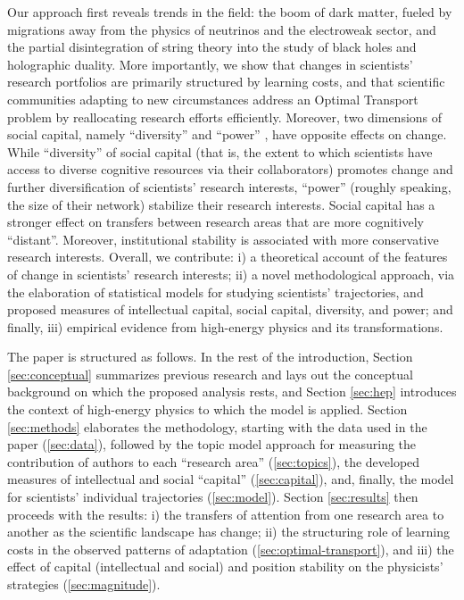 \documentclass{article}
\begin{document}
Our approach first reveals trends in the field: the boom of dark matter, fueled by migrations away from the physics of neutrinos and the electroweak sector, and the partial disintegration of string theory into the study of black holes and holographic duality. More importantly, we show that changes in scientists' research portfolios are primarily structured by learning costs, and that scientific communities adapting to new circumstances address an Optimal Transport problem by reallocating research efforts efficiently. Moreover, two dimensions of social capital, namely ``diversity'' and ``power'' \citep{Abbasi2014}, have opposite effects on change. While ``diversity'' of social capital (that is, the extent to which scientists have access to diverse cognitive resources via their collaborators) promotes change and further diversification of scientists' research interests, ``power'' (roughly speaking, the size of their network) stabilize their research interests. Social capital has a stronger effect on transfers between research areas that are more cognitively ``distant''. Moreover, institutional stability is associated with more conservative research interests. %
Overall, we contribute: i) a theoretical account of the features of change in scientists' research interests; ii) a novel methodological approach, via the elaboration of statistical models for studying scientists' trajectories, and proposed measures of intellectual capital, social capital, diversity, and power; and finally, iii) empirical evidence from high-energy physics and its transformations.

The paper is structured as follows. In the rest of the introduction, Section \ref{sec:conceptual} summarizes previous research and lays out the conceptual background on which the proposed analysis rests, and Section \ref{sec:hep} introduces the context of high-energy physics to which the model is applied. %
Section \ref{sec:methods} elaborates the methodology, starting with the data used in the paper (\ref{sec:data}), followed by the topic model approach for measuring the contribution of authors to each ``research area'' (\ref{sec:topics}), the developed measures of intellectual and social ``capital'' (\ref{sec:capital}), and, finally, the model for scientists' individual trajectories (\ref{sec:model}).
Section \ref{sec:results} then proceeds with the results: i) the transfers of attention from one research area to another as the scientific landscape has change; ii) the structuring role of learning costs in the observed patterns of adaptation (\ref{sec:optimal-transport}), and iii) the effect of capital (intellectual and social) and position stability on the physicists' strategies (\ref{sec:magnitude}). %
\end{document}
